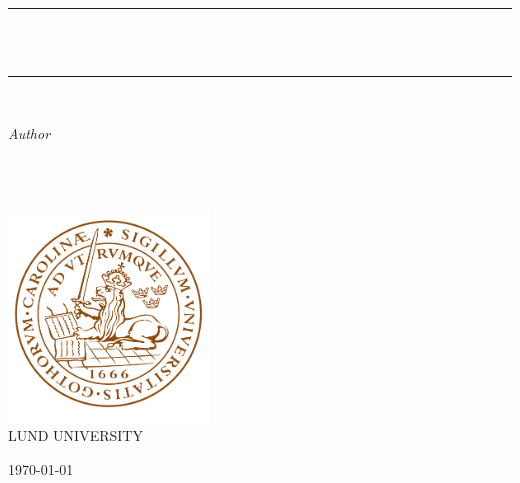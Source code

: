 \begin{titlepage}  

	\newcommand{\HRule}{\rule{\linewidth}{0.5mm}}
	
 \centering 	
 
	\textsc{\LARGE \Course}\\[2cm] 
 
	\HRule\\[1.0cm]
 
	{\huge\bfseries \Title }\\[0.4cm] 
 
	\HRule\\[1.5cm]
 
	\begin{minipage}[t]{0.5\textwidth}
	\begin{center}
 
		\large
   
		\textit{Author}\\
   
		\AuthorOne \\
        \AuthorTwo
            
        \href{mailto:\EmailOne}{\texttt{\EmailOne}} \\
            
        \href{mailto:\EmailTwo}{\texttt{\EmailTwo}}
            
        \vspace{5mm}
                
        \SupervisorInfo
                
	\end{center}
	\end{minipage}

	\vfill\vfill\vfill\vfill
 
   \includegraphics[width=0.4\textwidth]{Figures/Lund logo.png}
    \\ \textsc{\LARGE {LUND UNIVERSITY}}
    
	\vfill\vfill\vfill 
 
    \today
        
	\vfill 
 
\end{titlepage}
